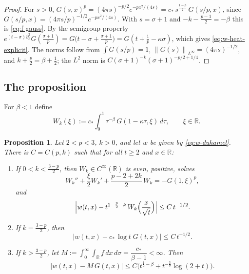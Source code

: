 \documentclass[11pt]{amsart}
\newtheorem{proposition}{Proposition}[section]
\theoremstyle{definition}
\theoremstyle{remark}
\numberwithin{equation}{section}
\newcommand{\R}{{\mathbb R}}
\newcommand{\pt}{\partial}
\newcommand{\norm}[1]{\left\lVert #1\right\rVert}
\begin{document}
\begin{proof}
For $s>0$, $G(s,x)^p=(4\pi s)^{-p/2}e^{-px^2/(4s)}=c_*\,s^{\frac{1-p}{2}}\,G(s/p,x)$, since
$G(s/p,x)=(4\pi s/p)^{-1/2}e^{-px^2/(4s)}$. With $s=\sigma+1$ and
$-k-\frac{p-1}{2}=-\beta$ this is \eqref{eq:f-gauss}. By the semigroup property
$e^{(t-\sigma)\pt_x^2}G(\frac{\sigma+1}p)=G\bigl(t-\sigma+\frac{\sigma+1}{p}\bigr)=G(t+\frac1p-\kappa\sigma)$,
which gives \eqref{eq:w-heat-explicit}. The norms follow from $\int G(s/p)=1$, $\norm{G(s)}_{L^\infty}=(4\pi s)^{-1/2}$,
and $k+\frac p2=\beta+\frac12$; the $L^2$ norm is $C(\sigma+1)^{-k}(\sigma+1)^{-p/2+1/4}$.
\end{proof}

\subsection{The proposition}

For $\beta<1$ define
\begin{equation}\label{eq:def-Wk}
W_k(\xi):=c_*\int_0^1\tau^{-\beta}\,G(1-\kappa\tau,\xi)\,d\tau,\qquad \xi\in\R .
\end{equation}

\begin{proposition}\label{prop:k-range}
Let $2<p<3$, $k>0$, and let $w$ be given by \eqref{eq:w-duhamel}. There is $C=C(p,k)$ such that for all
$t\ge2$ and $x\in\R$:
\begin{enumerate}
\item[(i)] If $0<k<\frac{3-p}{2}$, then $W_k\in C^\infty(\R)$ is even, positive, solves
\begin{equation}\label{eq:Wk-ode}
W_k''+\frac\xi2W_k'+\frac{p-2+2k}{2}\,W_k=-G(1,\xi)^p ,
\end{equation}
and
\begin{equation}\label{eq:prop-i}
\Bigl|w(t,x)-t^{1-\frac p2-k}\,W_k\Bigl(\frac{x}{\sqrt t}\Bigr)\Bigr|\le C\,t^{-1/2}.
\end{equation}
\item[(ii)] If $k=\frac{3-p}{2}$, then
\begin{equation}\label{eq:prop-ii}
\bigl|w(t,x)-c_*\,\log t\;G(t,x)\bigr|\le C\,t^{-1/2}.
\end{equation}
\item[(iii)] If $k>\frac{3-p}{2}$, let $M:=\int_0^\infty\!\!\int_{\R}f\,dx\,d\sigma=\dfrac{c_*}{\beta-1}<\infty$. Then
\begin{equation}\label{eq:prop-iii}
\bigl|w(t,x)-M\,G(t,x)\bigr|\le C\bigl(t^{\frac12-\beta}+t^{-\frac32}\log(2+t)\bigr).
\end{equation}
\end{enumerate}
\end{proposition}
\end{document}
